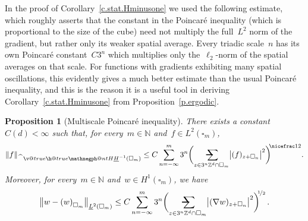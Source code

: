 \documentclass[11pt,twoside]{article} %
\makeatletter
\let\oldsquare\square %
\renewcommand{\square}{\oldsquare}
\numberwithin{equation}{section}
\newtheorem{proposition}[theorem]{Proposition}
\theoremstyle{definition}
\let\originalleft\left
\let\originalright\right
\renewcommand{\left}{\mathopen{}\mathclose\bgroup\originalleft}
\renewcommand{\right}{\aftergroup\egroup\originalright}
\newcommand*{\N}{\ensuremath{\mathbb{N}}}
\newcommand*{\Zd}{\ensuremath{\mathbb{Z}^d}}
\renewcommand*{\hat}{\widehat}
\newcommand{\cu}{\square}
\newcommand{\avsum}{\mathop{\mathpalette\avsuminner\relax}\displaylimits}
\newcommand\avsuminner[2]{%
  {\sbox0{$\m@th#1\sum$}%
   \vphantom{\usebox0}%
   \ooalign{%
     \hidewidth
     \smash{\,\rule[.23em]{8.8pt}{1.1pt} \relax}%
     \hidewidth\cr
   ~$\m@th#1\sum$\cr
   }%
  }%
}
\newcommand{\negphantom}{\v@true\h@true\negph@nt}
\newcommand{\negph@nt}{\ifmmode\expandafter\mathpalette 
  \expandafter\mathnegph@nt\else\expandafter\makenegph@nt\fi}
\newcommand{\makenegph@nt}[1]{%
  \setbox\z@\hbox{\color@begingroup#1\color@endgroup}\finnegph@nt}
\newcommand{\finnegph@nt}{%
  \setbox\tw@\null 
  \ifv@ \ht\tw@\ht\z@\dp\tw@\dp\z@\fi \ifh@\wd\tw@-\wd\z@\fi\box\tw@}
\newcommand{\mathnegph@nt}[2]{%
  \setbox\z@\hbox{$\m@th #1{#2}$}\finnegph@nt}
\newcommand{\Hminusul}{\hat{\phantom{H}}\negphantom{H}\underline{H}^{-1}}
\makeatother
\begin{document}
In the proof of Corollary~\ref{c.stat.Hminusone} we used the following estimate, which roughly asserts that the constant in the Poincar\'e inequality (which is  proportional to the size of the cube) need not multiply the full~$L^2$ norm of the gradient, but rather only its weaker spatial average. Every triadic scale~$n$ has its own Poincar\'e constant~$C3^n$ which multiplies only the~$\ell_2$-norm of the spatial averages on that scale. For functions with gradients exhibiting many spatial oscillations, this evidently gives a much better estimate than the usual Poincar\'e inequality, and this is the reason it is a useful tool in deriving Corollary~\ref{c.stat.Hminusone} from Proposition~\ref{p.ergodic}. 

\begin{proposition}[Multiscale Poincar\'e inequality]
\label{p.MSP}
There exists a constant~$C(d)<\infty$ such that, for every~$m \in \N$ and~$f\in L^2(\cu_m)$, 
\begin{equation}
\label{e.MSP}
\left\| f \right\|_{\Hminusul(\cu_m)}
\leq
C 
\sum_{n=-\infty}^{{m}} 3^{n} 
\biggl( \avsum_{z\in 3^n\Zd\cap \cu_{m}} 
\bigl|  ( f  )_{z+\cu_n} \bigr|^2 \biggr)^{\!\!\nicefrac12}. 
\end{equation}
Moreover, for every~$m \in \N$ and~$w \in H^1(\cu_{m})$, we have
\begin{equation} 
\label{e.MSPw}
\left\| w - \left( w \right)_{\cu_{m}} \right\|_{\underline{L}^2(\cu_{m}) }
\leq 
C \sum_{n=-\infty}^{{m}} 3^{n} 
\biggl( 
\avsum_{z\in 3^n\Zd\cap \cu_{m}} 
\bigl|  ( \nabla w  )_{z+\cu_n} \bigr|^2
\biggr)^{\!\!\nicefrac12}
\,.
\end{equation}

\end{proposition}
\end{document}
